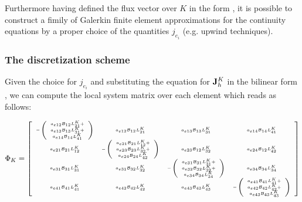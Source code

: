 Furthermore having defined the flux vector over $K$ in the form , it is possible to construct a fimily of Galerkin finite element approximations for the continuity equations by a proper choice of the quantities $j_{e_i}$ (e.g. upwind techniques). 




\subsubsection{The discretization scheme}

Given the choice for $j_{e_i}$ and substituting the equation for $\mathbf{J}_h^K$ in the bilinear form , we can compute the local system matrix over each element which reads as follows:

\begin{equation}
\Phi_K  = 
{
\tiny 
\left[
\begin{array}{cccc}
- \left( \begin{array}{c}
a_{e12}\mathcal{B}_{12}L^K_{21} + \\
a_{e13}\mathcal{B}_{13}L^K_{31} + \\
a_{e14}\mathcal{B}_{14}L^K_{41}
\end{array} \right)

& a_{e12}\mathcal{B}_{12}L^K_{21} 
& a_{e13}\mathcal{B}_{13}L^K_{31}
& a_{e14}\mathcal{B}_{14}L^K_{41}
\\

a_{e21}\mathcal{B}_{21}L^K_{12}
&
- \left( \begin{array}{c}
a_{e21}\mathcal{B}_{21}L^K_{12} + \\
a_{e23}\mathcal{B}_{23}L^K_{32} + \\
a_{e24}\mathcal{B}_{24}L^K_{42}
\end{array} \right)
& a_{e23}\mathcal{B}_{12}L^K_{32}
& a_{e24}\mathcal{B}_{12}L^K_{42}
\\

a_{e31}\mathcal{B}_{31}L^K_{31}
& a_{e31}\mathcal{B}_{32}L^K_{32}
&
- \left( \begin{array}{c}
a_{e31}\mathcal{B}_{31}L^K_{31} + \\
a_{e32}\mathcal{B}_{32}L^K_{32} + \\
a_{e34}\mathcal{B}_{34}L^K_{34}
\end{array} \right)

&a_{e34}\mathcal{B}_{34}L^K_{34}
\\

a_{e41}\mathcal{B}_{41}L^K_{41}
& a_{e42}\mathcal{B}_{42}L^K_{42}
&a_{e43}\mathcal{B}_{43}L^K_{43}
&
- \left( \begin{array}{c}
a_{e41}\mathcal{B}_{41}L^K_{41} + \\
a_{e42}\mathcal{B}_{42}L^K_{42} + \\
a_{e43}\mathcal{B}_{43}L^K_{43}
\end{array} \right)

\end{array}
\right]
}
\end{equation}

